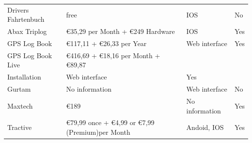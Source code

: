 \begin{singlespace}
\begin{tabular}{p{3cm}p{5cm}p{3cm}p{2cm}}
Drivers Fahrtenbuch        & free                                                                                                        & IOS                   & No  \\ 
Abax Triplog               & \euro 35,29 per Month + \euro 249 Hardware                                                                  & IOS                   & Yes \\ 
GPS Log Book               & \euro 117,11 + \euro 26,33 per Year                                                                         & Web interface         & Yes \\ 
GPS Log Book Live          & \euro 416,69 + \euro 18,16 per Month + \euro 89,87\\   Installation & Web interface         & Yes \\
Gurtam                     & No information                                                                                              & Web interface         & No  \\ 
Maxtech                    & \euro 189                                                                                                   & No information        & Yes \\ 
Tractive                   & \euro 79,99 once + \euro 4,99 or \euro 7,99 (Premium)per Month                                              & Andoid, IOS           & Yes \\ 
\bottomrule
\end{tabular}
\end{singlespace} 
\clearpageauthor

